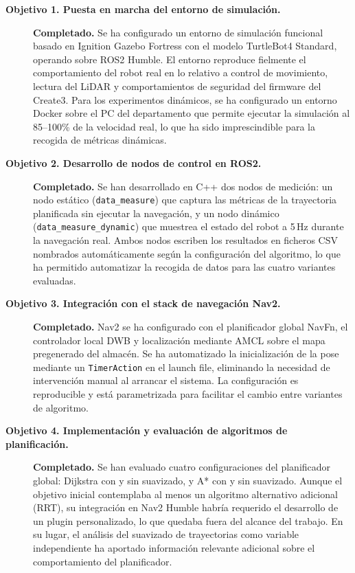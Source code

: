\begin{description}
    \item[\textbf{Objetivo 1. Puesta en marcha del entorno de simulación.}] \hfill\break
    \textbf{Completado.} Se ha configurado un entorno de simulación funcional basado en Ignition Gazebo Fortress con el modelo TurtleBot4 Standard, operando sobre ROS2 Humble. El entorno reproduce fielmente el comportamiento del robot real en lo relativo a control de movimiento, lectura del LiDAR y comportamientos de seguridad del firmware del Create3. Para los experimentos dinámicos, se ha configurado un entorno Docker sobre el PC del departamento que permite ejecutar la simulación al 85--100\% de la velocidad real, lo que ha sido imprescindible para la recogida de métricas dinámicas.

    \item[\textbf{Objetivo 2. Desarrollo de nodos de control en ROS2.}] \hfill\break
    \textbf{Completado.} Se han desarrollado en C++ dos nodos de medición: un nodo estático (\texttt{data\_measure}) que captura las métricas de la trayectoria planificada sin ejecutar la navegación, y un nodo dinámico (\texttt{data\_measure\_dynamic}) que muestrea el estado del robot a 5\,Hz durante la navegación real. Ambos nodos escriben los resultados en ficheros CSV nombrados automáticamente según la configuración del algoritmo, lo que ha permitido automatizar la recogida de datos para las cuatro variantes evaluadas.

    \item[\textbf{Objetivo 3. Integración con el stack de navegación Nav2.}] \hfill\break
    \textbf{Completado.} Nav2 se ha configurado con el planificador global NavFn, el controlador local DWB y localización mediante AMCL sobre el mapa pregenerado del almacén. Se ha automatizado la inicialización de la pose mediante un \texttt{TimerAction} en el launch file, eliminando la necesidad de intervención manual al arrancar el sistema. La configuración es reproducible y está parametrizada para facilitar el cambio entre variantes de algoritmo.

    \item[\textbf{Objetivo 4. Implementación y evaluación de algoritmos de planificación.}] \hfill\break
    \textbf{Completado.} Se han evaluado cuatro configuraciones del planificador global: Dijkstra con y sin suavizado, y A* con y sin suavizado. Aunque el objetivo inicial contemplaba al menos un algoritmo alternativo adicional (RRT), su integración en Nav2 Humble habría requerido el desarrollo de un plugin personalizado, lo que quedaba fuera del alcance del trabajo. En su lugar, el análisis del suavizado de trayectorias como variable independiente ha aportado información relevante adicional sobre el comportamiento del planificador.


\end{description}
